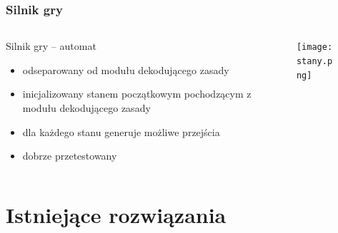 \documentclass{beamer}
\begin{document}
\begin{frame}
	\frametitle{Silnik gry}
	\begin{columns}
		\begin{column}{.50\textwidth}
			Silnik gry -- automat
			\begin{itemize}
				\item odseparowany od modułu dekodującego zasady
				\item inicjalizowany stanem początkowym pochodzącym z modułu dekodującego zasady
				\item dla każdego stanu generuje możliwe przejścia
				\item dobrze przetestowany
			\end{itemize}
		\end{column}%
		\hfill
		\begin{column}{.50\textwidth}
			\begin{figure}
				\texttt{[image: stany.png]}
				\centering
			\end{figure}
		\end{column}
	\end{columns}
\end{frame}



\section{Istniejące rozwiązania}
\end{document}
